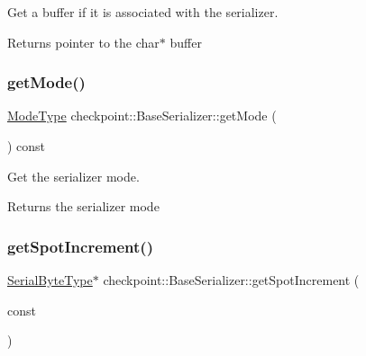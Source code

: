 Get a buffer if it is associated with the serializer. 

\begin{DoxyReturn}{Returns}
pointer to the {\ttfamily char$\ast$} buffer 
\end{DoxyReturn}
\mbox{\label{structcheckpoint_1_1_base_serializer_ad9a3bf9aa8081b6efdf8a45ba92ef641}} 
\subsubsection{\texorpdfstring{get\+Mode()}{getMode()}}
{\footnotesize\ttfamily \hyperlink{namespacecheckpoint_ae2509499ccd8b1dc48fb535bf8aa3059}{Mode\+Type} checkpoint\+::\+Base\+Serializer\+::get\+Mode (\begin{DoxyParamCaption}{ }\end{DoxyParamCaption}) const\hspace{0.3cm}{\ttfamily [inline]}}



Get the serializer mode. 

\begin{DoxyReturn}{Returns}
the serializer mode 
\end{DoxyReturn}
\mbox{\label{structcheckpoint_1_1_base_serializer_aa8c9131306f16832b72ce6abbffd825d}} 
\subsubsection{\texorpdfstring{get\+Spot\+Increment()}{getSpotIncrement()}}
{\footnotesize\ttfamily \hyperlink{namespacecheckpoint_ae57f01cdc0b81776c23b6c7c934c58f5}{Serial\+Byte\+Type}$\ast$ checkpoint\+::\+Base\+Serializer\+::get\+Spot\+Increment (\begin{DoxyParamCaption}\item[{\hyperlink{namespacecheckpoint_a083f6674da3f94c2901b18c6d238217c}{Serial\+Size\+Type}}]{const }\end{DoxyParamCaption})\hspace{0.3cm}{\ttfamily [inline]}}



